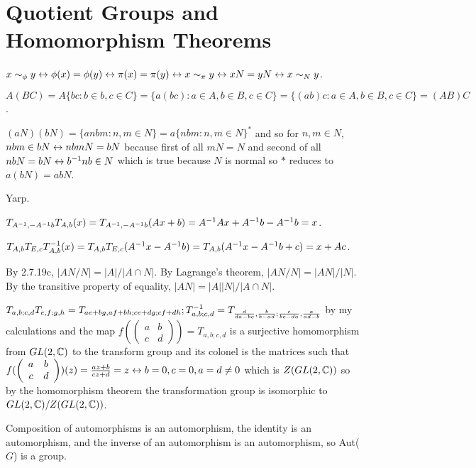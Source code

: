 \documentclass[11pt, oneside]{article}   	%
\begin{document}
\section{Quotient Groups and Homomorphism Theorems}
\be
\item $x \sim_\phi y \leftrightarrow \phi(x) = \phi(y) \leftrightarrow \pi(x) = \pi(y) \leftrightarrow x \sim_\pi y \leftrightarrow xN = yN \leftrightarrow x \sim_N y$.
\item \be
\item $A(BC) = A\{bc: b\in b, c \in C\} = \{a(bc) : a \in A, b \in B, c \in C\} = \{(ab)c : a\in A, b \in B, c \in C\} = (AB)C$.
\item $(aN)(bN) = \{anbm: n, m \in N\} = a\{nbm : n, m \in N\}^*$ and so for $n, m \in N$, $nbm \in bN \leftrightarrow nbmN = bN$ because first of all $mN = N$ and second of all $nbN = bN \leftrightarrow b^{-1} nb \in N$ which is true because $N$ is normal so $*$ reduces to $a(bN) = abN$.
\item Yarp.
\ee
\item \be
\item $T_{A^{-1}, -A^{-1} b}T_{A, b}(x) = T_{A^{-1}, -A^{-1} b}(Ax + b) = A^{-1} Ax + A^{-1} b - A^{-1} b = x$.
\item $T_{A, b}T_{E, c}T_{A, b}^{-1}(x) = T_{A, b}T_{E, c}(A^{-1} x - A^{-1} b) = T_{A, b}(A^{-1} x - A^{-1} b + c) = x + Ac$.
\ee
\item By 2.7.19c, $|AN/N| = |A| / |A \cap N|.$ By Lagrange's theorem, $|AN / N| = |AN| / |N|$. By the transitive property of equality, $|AN|= |A| |N|/ |A \cap N|$.
\item $T_{a, b; c, d}T_{e, f; g, h} = T_{ae + bg, af + bh; ce + dg; cf + dh}; T_{a, b; c, d}^{-1} = T_{\frac{d}{da - bc}, \frac{b}{b - ad}; \frac{c}{bc - da}, \frac{a}{ad-b}}$ by my calculations and the map $f(\left( \begin{array}{cc} a & b \\ c & d \end{array} \right) ) = T_{a, b; c, d}$ is a surjective homomorphism from $GL(2, \mathbb{C})$ to the transform group and its colonel is the matrices such that $f(\left( \begin{array}{cc} a & b \\ c & d \end{array} \right) )(z) = \frac{az + b}{cz + d} = z \leftrightarrow b = 0, c = 0, a = d\not = 0$ which is $Z(GL(2, \mathbb{C}))$ so by the homomorphism theorem the transformation group is isomorphic to $GL(2, \mathbb{C}) / Z(GL(2, \mathbb{C}))$. 
\item \be
\item Composition of automorphisms is an automorphism, the identity is an automorphism, and the inverse of an automorphism is an automorphism, so Aut($G$) is a group.
\end{document}

